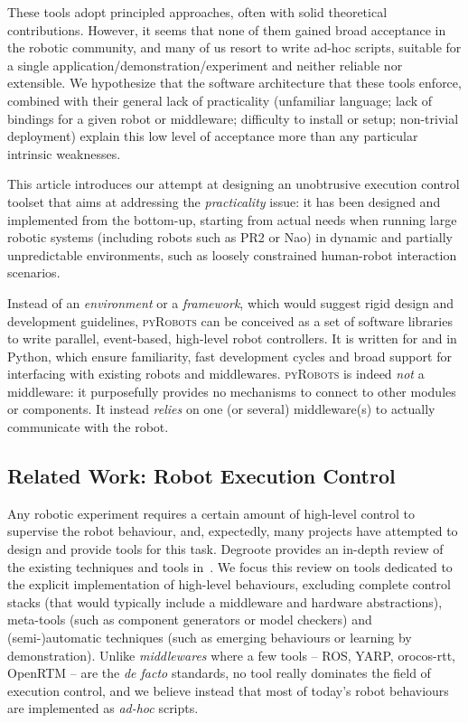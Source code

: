 \documentclass[a4paper, 10pt, conference]{ieeeconf}      %
\newcommand{\pyRobots}{\textsc{pyRobots}}
\begin{document}
These tools adopt principled approaches, often with solid theoretical
contributions. However, it seems that none of them gained broad acceptance in
the robotic community, and many of us resort to write ad-hoc scripts, suitable
for a single application/demonstration/experiment and neither reliable nor
extensible. We hypothesize that the software architecture that these tools
enforce, combined with their general lack of practicality (unfamiliar language;
lack of bindings for a given robot or middleware; difficulty to install or
setup; non-trivial deployment) explain this low level of acceptance more than
any particular intrinsic weaknesses.

This article introduces our attempt at designing an unobtrusive execution
control toolset that aims at addressing the \emph{practicality} issue: it has
been designed and implemented from the bottom-up, starting from actual needs
when running large robotic systems (including robots such as PR2 or Nao) in
dynamic and partially unpredictable environments, such as loosely constrained
human-robot interaction scenarios.

Instead of an \emph{environment} or a \emph{framework}, which would suggest
rigid design and development guidelines, \pyRobots{} can be conceived as a set
of software libraries to write parallel, event-based, high-level robot
controllers.  It is written for and in Python, which ensure familiarity, fast
development cycles and broad support for interfacing with existing robots and
middlewares. \pyRobots{} is indeed \emph{not} a middleware: it purposefully
provides no mechanisms to connect to other modules or components. It instead
\emph{relies} on one (or several) middleware(s) to actually communicate with the
robot.

\subsection{Related Work: Robot Execution Control}

Any robotic experiment requires a certain amount of high-level control to
supervise the robot behaviour, and, expectedly, many projects have attempted to
design and provide tools for this task. Degroote provides an in-depth review of
the existing techniques and tools in~\cite{degroote2012architecture}. We focus
this review on tools dedicated to the explicit implementation of high-level
behaviours, excluding complete control stacks (that would typically include a
middleware and hardware abstractions), meta-tools (such as component generators
or model checkers) and (semi-)automatic techniques (such as emerging behaviours
or learning by demonstration). Unlike \emph{middlewares} where a few tools --
ROS, YARP, {\sc orocos}-rtt, OpenRTM -- are the \emph{de facto} standards, no tool really
dominates the field of execution control, and we believe instead that most of
today's robot behaviours are implemented as \emph{ad-hoc} scripts.
\end{document}
